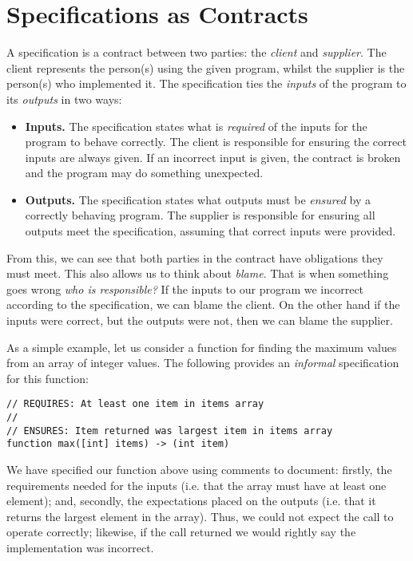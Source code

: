 \section{Specifications as Contracts}
A specification is a contract between two parties: the {\em client} and {\em supplier}.  The client represents the person(s) using the given program, whilst the supplier is the person(s) who implemented it.  The specification ties the {\em inputs} of the program to its {\em outputs} in two ways:
\begin{itemize}
\item {\bf Inputs.} The specification states what is {\em required} of the inputs for the program to behave correctly.  The client is responsible for ensuring the correct inputs are always given.  If an incorrect input is given, the contract is broken and the program may do something unexpected.
\item {\bf Outputs.} The specification states what outputs must be {\em ensured} by a correctly behaving program.  The supplier is responsible for ensuring all outputs meet the specification, assuming that correct inputs were provided.
\end{itemize}
From this, we can see that both parties in the contract have obligations they must meet.  This also allows us to think about {\em blame}.  That is when something goes wrong {\em who is responsible?}  If the inputs to our program we incorrect according to the specification, we can blame the client.  On the other hand if the inputs were correct, but the outputs were not, then we can blame the supplier.

\begin{eg}
As a simple example, let us consider a function for finding the maximum values from an array of integer values.  The following provides an {\em informal} specification for this function:
\begin{lstlisting}
// REQUIRES: At least one item in items array
//
// ENSURES: Item returned was largest item in items array
function max([int] items) -> (int item)
\end{lstlisting}
We have specified our function above using comments to document: firstly, the requirements needed for the inputs (i.e. that the array must have at least one element); and, secondly, the expectations placed on the outputs (i.e. that it returns the largest element in the array).  Thus, we could not expect the call  to operate correctly; likewise, if the call  returned  we would rightly say the implementation was incorrect.
\end{eg}

